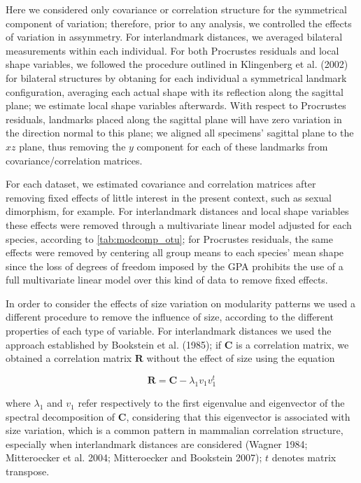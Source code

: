 \documentclass[12pt,]{article}
\begin{document}
Here we considered only covariance or correlation structure for the
symmetrical component of variation; therefore, prior to any analysis, we
controlled the effects of variation in assymmetry. For interlandmark
distances, we averaged bilateral measurements within each individual.
For both Procrustes residuals and local shape variables, we followed the
procedure outlined in Klingenberg et al. (2002) for bilateral structures
by obtaning for each individual a symmetrical landmark configuration,
averaging each actual shape with its reflection along the sagittal
plane; we estimate local shape variables afterwards. With respect to
Procrustes residuals, landmarks placed along the sagittal plane will
have zero variation in the direction normal to this plane; we aligned
all specimens' sagittal plane to the $xz$ plane, thus removing the $y$
component for each of these landmarks from covariance/correlation
matrices.

For each dataset, we estimated covariance and correlation matrices after
removing fixed effects of little interest in the present context, such
as sexual dimorphism, for example. For interlandmark distances and local
shape variables these effects were removed through a multivariate linear
model adjusted for each species, according to \autoref{tab:modcomp_otu};
for Procrustes residuals, the same effects were removed by centering all
group means to each species' mean shape since the loss of degrees of
freedom imposed by the GPA prohibits the use of a full multivariate
linear model over this kind of data to remove fixed effects.

In order to consider the effects of size variation on modularity
patterns we used a different procedure to remove the influence of size,
according to the different properties of each type of variable. For
interlandmark distances we used the approach established by Bookstein et
al. (1985); if $\mathbf{C}$ is a correlation matrix, we obtained a
correlation matrix $\mathbf{R}$ without the effect of size using the
equation

\begin{equation}
\mathbf{R} = \mathbf{C} - \lambda_1 v_1 v^{t}_1
\label{eq:iso}
\end{equation}

where $\lambda_1$ and $v_1$ refer respectively to the first eigenvalue
and eigenvector of the spectral decomposition of $\mathbf{C}$,
considering that this eigenvector is associated with size variation,
which is a common pattern in mammalian correlation structure, especially
when interlandmark distances are considered (Wagner 1984; Mitteroecker
et al. 2004; Mitteroecker and Bookstein 2007); $t$ denotes matrix
transpose.
\end{document}
